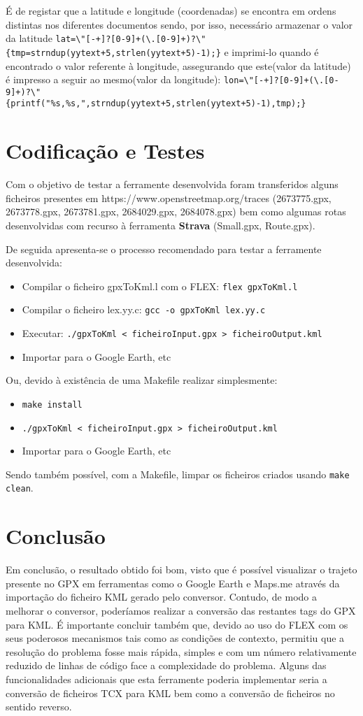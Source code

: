 \documentclass{llncs}
\begin{document}
É de registar que a latitude e longitude (coordenadas) se encontra em ordens distintas nos diferentes documentos sendo, por isso, necessário armazenar o valor da latitude
\verb|lat=\"[-+]?[0-9]+(\.[0-9]+)?\"                     {tmp=strndup(yytext+5,strlen(yytext+5)-1);}|
e imprimi-lo quando é encontrado o valor referente à longitude, assegurando que este(valor da latitude) é impresso a seguir ao mesmo(valor da longitude):
\verb|lon=\"[-+]?[0-9]+(\.[0-9]+)?\"                     {printf("%s,%s,",strndup(yytext+5,strlen(yytext+5)-1),tmp);}|


\section{Codificação e Testes}
Com o objetivo de testar a ferramente desenvolvida foram transferidos alguns ficheiros presentes em https://www.openstreetmap.org/traces (2673775.gpx, 2673778.gpx, 2673781.gpx, 2684029.gpx, 2684078.gpx) bem como algumas rotas desenvolvidas com recurso à ferramenta \textbf{Strava} (Small.gpx, Route.gpx).

De seguida apresenta-se o processo recomendado para testar a ferramente desenvolvida:
\begin{itemize}
    \item Compilar o ficheiro gpxToKml.l com o FLEX: \verb|flex gpxToKml.l|
    \item Compilar o ficheiro lex.yy.c: \verb|gcc -o gpxToKml lex.yy.c|
    \item Executar: \verb|./gpxToKml < ficheiroInput.gpx > ficheiroOutput.kml|
    \item Importar para o Google Earth, etc
\end{itemize}

Ou, devido à existência de uma Makefile realizar simplesmente:
\begin{itemize}
    \item \verb|make install|
    \item \verb|./gpxToKml < ficheiroInput.gpx > ficheiroOutput.kml|
    \item Importar para o Google Earth, etc
\end{itemize}

Sendo também possível, com a Makefile, limpar os ficheiros criados usando \verb|make clean|.

\section{Conclusão}
Em conclusão, o resultado obtido foi bom, visto que é possível visualizar o trajeto presente no GPX em ferramentas como o Google Earth e Maps.me através da importação do ficheiro KML gerado pelo conversor. Contudo, de modo a melhorar o conversor, poderíamos realizar a conversão das restantes tags do GPX para KML. É importante concluir também que, devido ao uso do FLEX com os seus poderosos mecanismos tais como as condições de contexto, permitiu que a resolução do problema fosse mais rápida, simples e com um número relativamente reduzido de linhas de código face a complexidade do problema. Alguns das funcionalidades adicionais que esta ferramente poderia implementar seria a conversão de ficheiros TCX para KML bem como a conversão de ficheiros no sentido reverso. 
\end{document}
